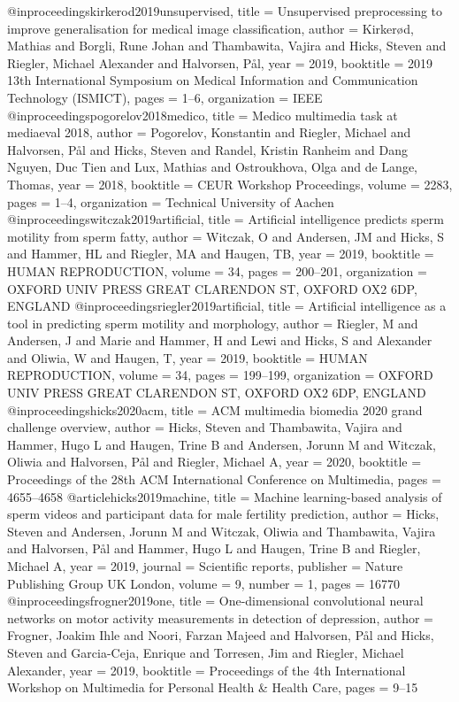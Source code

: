 @inproceedings{kirkerod2019unsupervised,
	title = {Unsupervised preprocessing to improve generalisation for medical image classification},
	author = {Kirker{\o}d, Mathias and Borgli, Rune Johan and Thambawita, Vajira and Hicks, Steven and Riegler, Michael Alexander and Halvorsen, P{\aa}l},
	year = 2019,
	booktitle = {2019 13th International Symposium on Medical Information and Communication Technology (ISMICT)},
	pages = {1--6},
	organization = {IEEE}
}
@inproceedings{pogorelov2018medico,
	title = {Medico multimedia task at mediaeval 2018},
	author = {Pogorelov, Konstantin and Riegler, Michael and Halvorsen, P{\aa}l and Hicks, Steven and Randel, Kristin Ranheim and Dang Nguyen, Duc Tien and Lux, Mathias and Ostroukhova, Olga and de Lange, Thomas},
	year = 2018,
	booktitle = {CEUR Workshop Proceedings},
	volume = 2283,
	pages = {1--4},
	organization = {Technical University of Aachen}
}
@inproceedings{witczak2019artificial,
	title = {Artificial intelligence predicts sperm motility from sperm fatty},
	author = {Witczak, O and Andersen, JM and Hicks, S and Hammer, HL and Riegler, MA and Haugen, TB},
	year = 2019,
	booktitle = {HUMAN REPRODUCTION},
	volume = 34,
	pages = {200--201},
	organization = {OXFORD UNIV PRESS GREAT CLARENDON ST, OXFORD OX2 6DP, ENGLAND}
}
@inproceedings{riegler2019artificial,
	title = {Artificial intelligence as a tool in predicting sperm motility and morphology},
	author = {Riegler, M and Andersen, J and Marie and Hammer, H and Lewi and Hicks, S and Alexander and Oliwia, W and Haugen, T},
	year = 2019,
	booktitle = {HUMAN REPRODUCTION},
	volume = 34,
	pages = {199--199},
	organization = {OXFORD UNIV PRESS GREAT CLARENDON ST, OXFORD OX2 6DP, ENGLAND}
}
@inproceedings{hicks2020acm,
	title = {ACM multimedia biomedia 2020 grand challenge overview},
	author = {Hicks, Steven and Thambawita, Vajira and Hammer, Hugo L and Haugen, Trine B and Andersen, Jorunn M and Witczak, Oliwia and Halvorsen, P{\aa}l and Riegler, Michael A},
	year = 2020,
	booktitle = {Proceedings of the 28th ACM International Conference on Multimedia},
	pages = {4655--4658}
}
@article{hicks2019machine,
	title = {Machine learning-based analysis of sperm videos and participant data for male fertility prediction},
	author = {Hicks, Steven and Andersen, Jorunn M and Witczak, Oliwia and Thambawita, Vajira and Halvorsen, P{\aa}l and Hammer, Hugo L and Haugen, Trine B and Riegler, Michael A},
	year = 2019,
	journal = {Scientific reports},
	publisher = {Nature Publishing Group UK London},
	volume = 9,
	number = 1,
	pages = 16770
}
@inproceedings{frogner2019one,
	title = {One-dimensional convolutional neural networks on motor activity measurements in detection of depression},
	author = {Frogner, Joakim Ihle and Noori, Farzan Majeed and Halvorsen, P{\aa}l and Hicks, Steven and Garcia-Ceja, Enrique and Torresen, Jim and Riegler, Michael Alexander},
	year = 2019,
	booktitle = {Proceedings of the 4th International Workshop on Multimedia for Personal Health \& Health Care},
	pages = {9--15}
}
